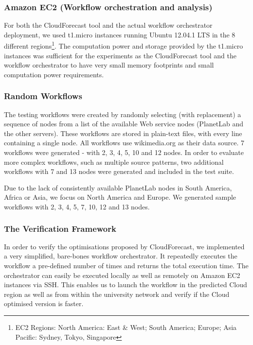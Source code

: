 \documentclass[10pt, conference, compsocconf]{IEEEtran}
\newcommand{\sysname}{CloudForecast\xspace}
\begin{document}
\subsubsection{Amazon EC2 (Workflow orchestration and analysis)}

For both the \sysname tool and the actual workflow orchestrator deployment, we used t1.micro instances running Ubuntu 12.04.1 LTS in the 8 different regions\footnote{EC2 Regions: North America: East \& West; South America; Europe; Asia Pacific: Sydney, Tokyo, Singapore}. The computation power and storage provided by the t1.micro instances was sufficient for the experiments as the \sysname tool and the workflow orchestrator to have very small memory footprints and small computation power requirements.




\subsubsection{Random Workflows}
The testing workflows were created by randomly selecting (with replacement) a sequence of nodes from a list of the available Web service nodes (PlanetLab and the other servers). These workflows are stored in plain-text files, with every line containing a single node. All workflows use wikimedia.org as their data source. 7 workflows were generated - with 2, 3, 4, 5, 10 and 12 nodes. In order to evaluate more complex workflows, such as multiple source patterns, two additional workflows with 7 and 13 nodes were generated and included in the test suite.

Due to the lack of consistently available PlanetLab nodes in South America, Africa or Asia, we focus on North America and Europe. We generated sample workflows with 2, 3, 4, 5, 7, 10, 12 and 13 nodes.



\subsubsection{The Verification Framework}

In order to verify the optimisations proposed by \sysname, we implemented a very simplified, bare-bones workflow orchestrator. It repeatedly executes the workflow a pre-defined number of times and returns the total execution time. The orchestrator can easily be executed locally as well as remotely on Amazon EC2 instances via SSH. This enables us to launch the workflow in the predicted Cloud region as well as from within the university network and verify if the Cloud optimised version is faster.
\end{document}
